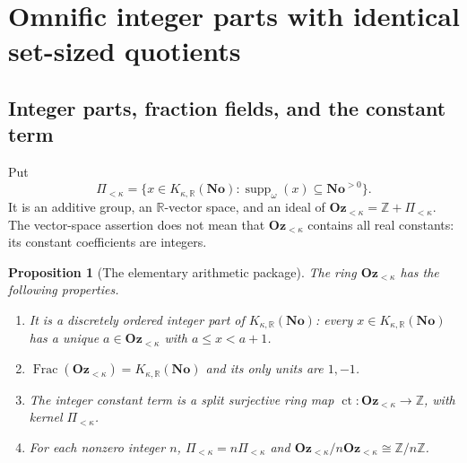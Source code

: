 \documentclass[11pt,letterpaper]{article}
\numberwithin{equation}{section}
\newtheorem{proposition}[theorem]{Proposition}
\theoremstyle{definition}
\theoremstyle{remark}
\newcommand{\R}{\mathbb R}
\newcommand{\No}{\mathbf{No}}
\newcommand{\Z}{\mathbb Z}
\newcommand{\Oz}{\mathbf{Oz}}
\newcommand{\suppw}{\operatorname{supp}_{\omega}}
\newcommand{\Frac}{\operatorname{Frac}}
\newcommand{\ct}{\operatorname{ct}}
\newcommand{\KN}[2]{K_{#1,#2}(\No)}%
\newcommand{\Ok}{\Oz_{<\kappa}}
\newcommand{\Pk}{\Pi_{<\kappa}}
\begin{document}
\section{Omnific integer parts with identical set-sized quotients}\label{fkc:sb:sec:omnific}

\subsection{Integer parts, fraction fields, and the constant term}
Put
\[
 \Pk=\{x\in\KN\kappa\R:\suppw(x)\subseteq\No^{>0}\}.
\]
It is an additive group, an $\R$-vector space, and an ideal of $\Ok=\Z+\Pk$. The vector-space assertion does not mean that $\Ok$ contains all real constants: its constant coefficients are integers.

\begin{proposition}[The elementary arithmetic package]\label{fkc:sb:prop:integerpart}
The ring $\Ok$ has the following properties.
\begin{enumerate}[label=\textup{(\alph*)}]
\item It is a discretely ordered integer part of $\KN\kappa\R$: every $x\in\KN\kappa\R$ has a unique $a\in\Ok$ with $a\le x<a+1$.
\item $\Frac(\Ok)=\KN\kappa\R$ and its only units are $1,-1$.
\item The integer constant term is a split surjective ring map $\ct:\Ok\to\Z$, with kernel $\Pk$.
\item For each nonzero integer $n$, $\Pk=n\Pk$ and $\Ok/n\Ok\cong\Z/n\Z$.
\end{enumerate}
\end{proposition}
\end{document}
